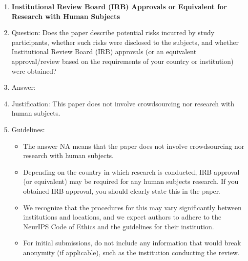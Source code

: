 \documentclass[11pt]{article}
\theoremstyle{plain}
\theoremstyle{definition}
\theoremstyle{remark}
\renewcommand{\^}[1]{^{(#1)}}
\begin{document}
\begin{enumerate}
\item {\bf Institutional Review Board (IRB) Approvals or Equivalent for Research with Human Subjects}
    \item[] Question: Does the paper describe potential risks incurred by study participants, whether such risks were disclosed to the subjects, and whether Institutional Review Board (IRB) approvals (or an equivalent approval/review based on the requirements of your country or institution) were obtained?
    \item[] Answer: \answerNA{} 
    \item[] Justification: This paper does not involve crowdsourcing nor research with human subjects.
    \item[] Guidelines:
    \begin{itemize}
        \item The answer NA means that the paper does not involve crowdsourcing nor research with human subjects.
        \item Depending on the country in which research is conducted, IRB approval (or equivalent) may be required for any human subjects research. If you obtained IRB approval, you should clearly state this in the paper. 
        \item We recognize that the procedures for this may vary significantly between institutions and locations, and we expect authors to adhere to the NeurIPS Code of Ethics and the guidelines for their institution. 
        \item For initial submissions, do not include any information that would break anonymity (if applicable), such as the institution conducting the review.
    \end{itemize}

\end{enumerate}

\fi
\end{document}
